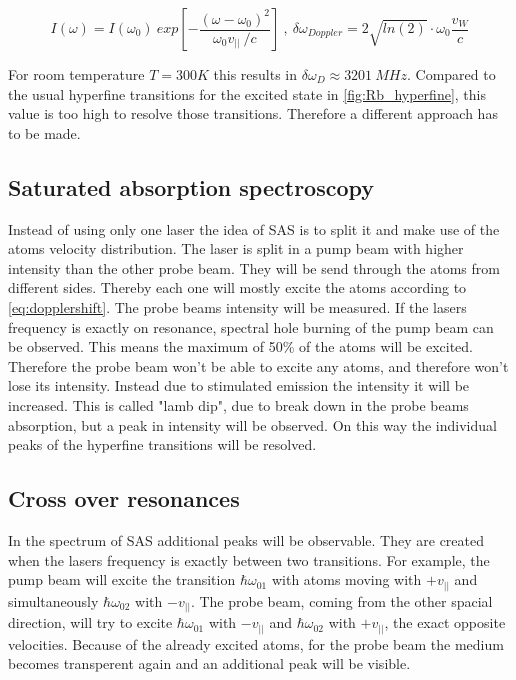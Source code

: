 \documentclass[]{article}
\begin{document}
\begin{equation}
I(\omega)=I(\omega_0)\ exp\left[ - \frac{(\omega-\omega_0)^2}{\omega_0v_{||}\ / c}\right] \:,\: \delta\omega_{Doppler} = 2 \sqrt{ln(2)} \cdot \omega_0\frac{v_W}{c}
\label{eq:gauss}
\end{equation}

For room temperature $T=300K$ this results in $\delta\omega_{D} \approx 3201\ MHz$. Compared to the usual hyperfine transitions for the excited state in \autoref{fig:Rb_hyperfine}, this value is too high to resolve those transitions. Therefore a different approach has to be made.

\subsection{Saturated absorption spectroscopy}
Instead of using only one laser the idea of SAS is to split it and make use of the atoms velocity distribution. The laser is split in a pump beam with higher intensity than the other probe beam. They will be send through the atoms from different sides. Thereby each one will mostly excite the atoms according to \autoref{eq:dopplershift}. The probe beams intensity will be measured. If the lasers frequency is exactly on resonance, spectral hole burning of the pump beam can be observed. This means the maximum of 50\% of the atoms will be excited. Therefore the probe beam won't be able to excite any atoms, and therefore won't lose its intensity. Instead due to stimulated emission the intensity it will be increased. This is called "lamb dip", due to break down in the probe beams absorption, but a peak in intensity will be observed. On this way the individual peaks of the hyperfine transitions will be resolved.

\subsection{Cross over resonances}
In the spectrum of SAS additional peaks will be observable. They are created when the lasers frequency is exactly between two transitions. For example, the pump beam will excite the transition $\hbar\omega_{01}$ with atoms moving with $+v_{||}$ and simultaneously $\hbar\omega_{02}$ with $-v_{||}$. The probe beam, coming from the other spacial direction, will try to excite $\hbar\omega_{01}$ with $-v_{||}$ and $\hbar\omega_{02}$ with $+v_{||}$, the exact opposite velocities. Because of the already excited atoms, for the probe beam the medium becomes transperent again and an additional peak will be visible.
\end{document}
